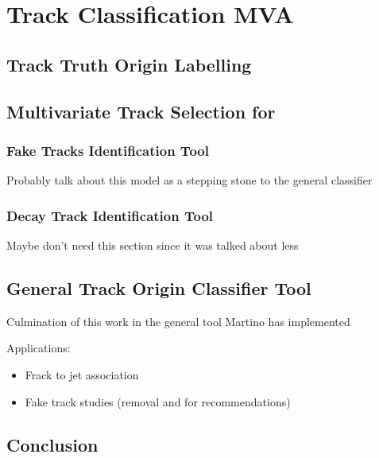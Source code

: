 \chapter{Track Classification MVA}\label{chap:track_classification_mva}




\section{Track Truth Origin Labelling}\label{sec:track labelling}


\section{Multivariate Track Selection for \texorpdfstring{\btagging}{b-tagging}}
\label{sec:mva track selection}

\subsection{Fake Tracks Identification Tool}\label{sec:remove fakes mva}

Probably talk about this model as a stepping stone to the general classifier


\subsection{\bhadron Decay Track Identification Tool}\label{sec:keep hf mva}

Maybe don't need this section since it was talked about less


\section{General Track Origin Classifier Tool}

Culmination of this work in the general tool Martino has implemented

Applications:
\begin{itemize}
    \item Frack to jet association
    \item Fake track studies (removal and for recommendations)
\end{itemize}

\section{Conclusion}

